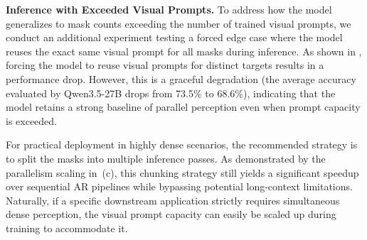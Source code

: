 \begin{table}[htbp]
\centering
\setlength{\belowcaptionskip}{8pt}
\caption{Impact of denoising steps on accuracy and latency on ParaDLC-Bench.}
\label{tab:denoising_steps_ablation}
\setlength{\tabcolsep}{6pt}
\renewcommand{\arraystretch}{1.15}
\end{table}

\noindent
\textbf{Inference with Exceeded Visual Prompts.}
To address how the model generalizes to mask counts exceeding the number of trained visual prompts, we conduct an additional experiment testing a forced edge case where the model reuses the exact same visual prompt for all masks during inference. As shown in , forcing the model to reuse visual prompts for distinct targets results in a performance drop. However, this is a graceful degradation (the average accuracy evaluated by Qwen3.5-27B drops from 73.5\% to 68.6\%), indicating that the model retains a strong baseline of parallel perception even when prompt capacity is exceeded. 

For practical deployment in highly dense scenarios, the recommended strategy is to split the masks into multiple inference passes. As demonstrated by the parallelism scaling in~(c), this chunking strategy still yields a significant speedup over sequential AR pipelines while bypassing potential long-context limitations. Naturally, if a specific downstream application strictly requires simultaneous dense perception, the visual prompt capacity can easily be scaled up during training to accommodate it.  

